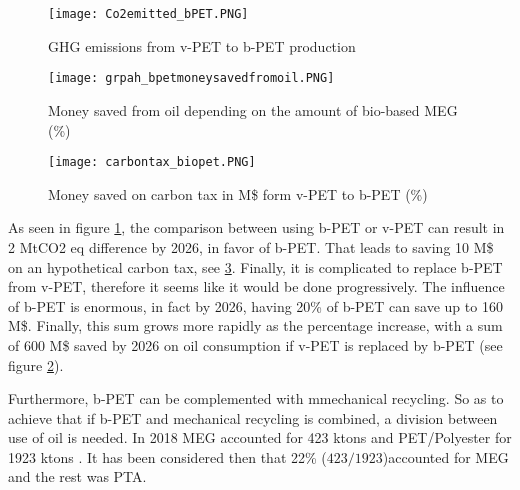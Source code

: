 \documentclass[twoside,a4paper,12pt]{report}
\begin{document}
\begin{figure} %
    \centering
    \texttt{[image: Co2emitted\_bPET.PNG]}
    \caption{GHG emissions from v-PET to b-PET production}
     \label{graph_bpetghgemissionssavedb} 
\end{figure}

\begin{figure} %
    \centering
    \texttt{[image: grpah\_bpetmoneysavedfromoil.PNG]}
    \caption{Money saved from oil depending on the amount of bio-based MEG (\%)}
     \label{graph_bpetssavingsoil} 
\end{figure}

\begin{figure} %
    \centering
    \texttt{[image: carbontax\_biopet.PNG]}
    \caption{Money saved on carbon tax in M\$ form v-PET to b-PET (\%)}
     \label{graph_bpetmoneysavedghg} 
\end{figure}


As seen in figure \ref{graph_bpetghgemissionssavedb}, the comparison between using b-PET or v-PET can result in 2 MtCO2 eq difference by 2026, in favor of b-PET. That leads to saving 10 M\$ on an hypothetical carbon tax, see \ref{graph_bpetmoneysavedghg}. Finally, it is complicated to replace b-PET from v-PET, therefore it seems like it would be done progressively. The influence of b-PET is enormous, in fact by 2026, having 20\% of b-PET can save up to 160 M\$. Finally, this sum grows more rapidly as the percentage increase, with a sum of 600 M\$ saved by 2026 on oil consumption if v-PET is replaced by b-PET (see figure \ref{graph_bpetssavingsoil}). 

Furthermore, b-PET can be complemented with mmechanical recycling. So as to achieve that if b-PET and mechanical recycling is combined, a division between use of oil is needed. In 2018 MEG accounted for 423 ktons and PET/Polyester for 1923 ktons \cite{PTITpetrochem2018}. It has been considered then that 22\% ($423/1923 $)accounted for MEG and the rest was PTA.
\end{document}
